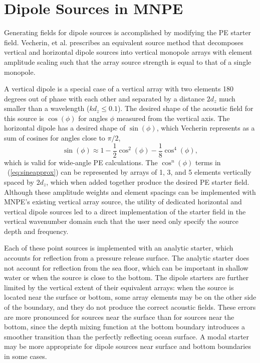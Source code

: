 \section{Dipole Sources in MNPE}\label{app:dipolesource}

Generating fields for dipole sources is accomplished by modifying the PE starter field. Vecherin, et al.\cite{Vecherin2011} prescribes an equivalent source method that decomposes vertical and horizontal dipole sources into vertical monopole arrays with element amplitude scaling such that the array source strength is equal to that of a single monopole.

A vertical dipole is a special case of a vertical array with two elements 180 degrees out of phase with each other and separated by a distance $2d_z$ much smaller than a wavelength ($kd_z\leq0.1$). The desired shape of the acoustic field for this source is $\cos(\phi)$ for angles $\phi$ measured from the vertical axis. The horizontal dipole has a desired shape of $\sin(\phi)$, which Vecherin represents as a sum of cosines for angles close to $\pi/2$,
\begin{equation}
\sin(\phi) \approx 1 - \frac{1}{2}\cos^2(\phi) - \frac{1}{8}\cos^4(\phi),\label{eq:sineapprox}
\end{equation}
which is valid for wide-angle PE calculations. The $\cos^n(\phi)$ terms in \eqnname~(\ref{eq:sineapprox}) can be represented by arrays of 1, 3, and 5 elements vertically spaced by $2d_z$, which when added together produce the desired PE starter field. Although these amplitude weights and element spacings can be implemented with MNPE's existing vertical array source, the utility of dedicated horizontal and vertical dipole sources led to a direct implementation of the starter field in the vertical wavenumber domain such that the user need only specify the source depth and frequency.

Each of these point sources is implemented with an analytic starter, which accounts for reflection from a pressure release surface. The analytic starter does not account for reflection from the sea floor, which can be important in shallow water or when the source is close to the bottom. The dipole starters are further limited by the vertical extent of their equivalent arrays: when the source is located near the surface or bottom, some array elements may be on the other side of the boundary, and they do not produce the correct acoustic fields. These errors are more pronounced for sources near the surface than for sources near the bottom, since the depth mixing function at the bottom boundary introduces a smoother transition than the perfectly reflecting ocean surface. A modal starter may be more appropriate for dipole sources near surface and bottom boundaries in some cases.
